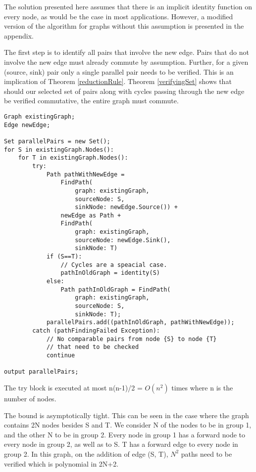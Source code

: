 \documentclass{article}
\newtheorem{theorem}{Theorem}
\begin{document}
The solution presented here assumes that there is an implicit identity function on every node, as would be the case in most applications. However, a modified version of the algorithm for graphs without this assumption is presented in the appendix.

The first step is to identify all pairs that involve the new edge.
Pairs that do not involve the new edge must already commute by assumption.
Further, for a given (source, sink) pair only a single parallel pair needs to be verified. This is an implication of Theorem \ref{reductionRule}.
Theorem \ref{verifyingSet} shows that should our selected set of pairs along with cycles passing through the new edge be verified commutative, the entire graph must commute. %


\begin{verbatim}
Graph existingGraph;
Edge newEdge;

Set parallelPairs = new Set();
for S in existingGraph.Nodes():
    for T in existingGraph.Nodes():
        try:
            Path pathWithNewEdge = 
                FindPath(
                    graph: existingGraph, 
                    sourceNode: S,
                    sinkNode: newEdge.Source()) +
                newEdge as Path +
                FindPath(
                    graph: existingGraph, 
                    sourceNode: newEdge.Sink(), 
                    sinkNode: T)
            if (S==T):
                // Cycles are a speacial case.
                pathInOldGraph = identity(S)
            else:
                Path pathInOldGraph = FindPath(
                    graph: existingGraph, 
                    sourceNode: S, 
                    sinkNode: T);
            parallelPairs.add((pathInOldGraph, pathWithNewEdge));
        catch (pathFindingFailed Exception):
            // No comparable pairs from node {S} to node {T} 
            // that need to be checked
            continue

output parallelPairs;
\end{verbatim}

The try block is executed at most n(n-1)/2 = $O(n^2)$ times where n is the number of nodes.

The bound is asymptotically tight.
This can be seen in the case where the graph contains 2N nodes besides S and T. We consider N of the nodes to be in group 1, and the other N to be in group 2. Every node in group 1 has a forward node to every node in group 2, as well as to S. T has a forward edge to every node in group 2. In this graph, on the addition of edge (S, T), $N^2$ paths need to be verified which is polynomial in 2N+2.
\end{document}
